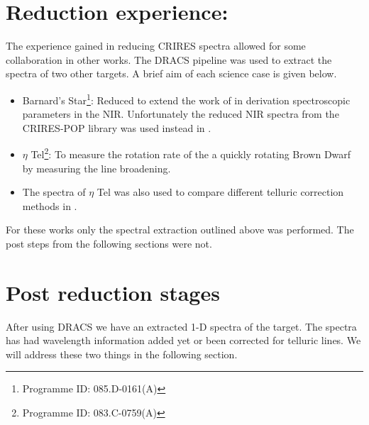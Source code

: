 \section{Reduction experience:}
The experience gained in reducing CRIRES spectra allowed for some collaboration in other works. The DRACS pipeline was used to extract the spectra of two other targets. A brief aim of each science case is given below.
\begin{itemize}
\item Barnard's Star\footnote{Programme ID: 085.D-0161(A)}: Reduced to extend the work of \citet{andreasen_nearinfrared_2016} in derivation spectroscopic parameters in the NIR. Unfortunately the reduced NIR spectra from the CRIRES-POP library was used instead in \citet{Andreasen et al. (in prep.)}. 
\item $\eta$ Tel\footnote{Programme ID: 083.C-0759(A)}: To measure the rotation rate of the a quickly rotating Brown Dwarf by measuring the line broadening. 
\item The spectra of $\eta$ Tel was also used to compare different telluric correction methods in \cite{ulmer-moll_telluric_2018}.
\end{itemize}

For these works only the spectral extraction outlined above was performed. The post  steps from the following sections were not.



\section{Post reduction stages}
\label{sec:posreduction}
After using DRACS we have an extracted 1-D spectra of the target. The spectra has had wavelength information added yet or been corrected for telluric lines. We will address these two things in the following section.

